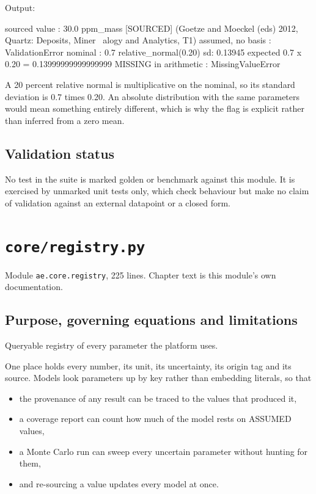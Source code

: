 \documentclass[10pt,a4paper,twoside]{report}
\begin{document}
{\footnotesize\color{slate}Output:\par}

\begin{outputblock}
sourced value           : 30.0 ppm_mass [SOURCED] (Goetze and Moeckel (eds) 2012, Quartz: Deposits, Miner
    \ alogy and Analytics, T1)
assumed, no basis       : ValidationError
nominal                 : 0.7
relative_normal(0.20) sd: 0.13945  expected 0.7 x 0.20 = 0.13999999999999999
MISSING in arithmetic   : MissingValueError
\end{outputblock}

A 20 percent relative normal is multiplicative on the nominal, so its standard deviation is 0.7 times 0.20. An absolute distribution with the same parameters would mean something entirely different, which is why the flag is explicit rather than inferred from a zero mean.

\section{Validation status}

No test in the suite is marked golden or benchmark against this module. It is exercised by unmarked unit tests only, which check behaviour but make no claim of validation against an external datapoint or a closed form.

\clearpage

\chapter{\texttt{core/registry.py}}\label{ch:registry}


{\footnotesize\color{slate}Module \texttt{ae.core.registry}, 225 lines. Chapter text is this module's own documentation.\par}

\section{Purpose, governing equations and limitations}

Queryable registry of every parameter the platform uses.

One place holds every number, its unit, its uncertainty, its origin tag and its source. Models look parameters up by key rather than embedding literals, so that

\begin{itemize}
\item the provenance of any result can be traced to the values that produced it,
\item a coverage report can count how much of the model rests on ASSUMED values,
\item a Monte Carlo run can sweep every uncertain parameter without hunting for them,
\item and re-sourcing a value updates every model at once.
\end{itemize}
\end{document}
